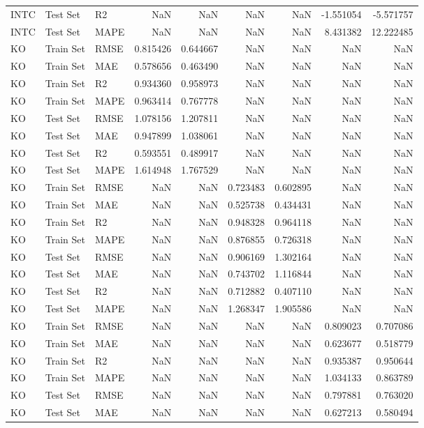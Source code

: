 \begin{tabular}{lllrrrrrr}
INTC & Test Set & R2 & NaN & NaN & NaN & NaN & -1.551054 & -5.571757 \\
INTC & Test Set & MAPE & NaN & NaN & NaN & NaN & 8.431382 & 12.222485 \\
KO & Train Set & RMSE & 0.815426 & 0.644667 & NaN & NaN & NaN & NaN \\
KO & Train Set & MAE & 0.578656 & 0.463490 & NaN & NaN & NaN & NaN \\
KO & Train Set & R2 & 0.934360 & 0.958973 & NaN & NaN & NaN & NaN \\
KO & Train Set & MAPE & 0.963414 & 0.767778 & NaN & NaN & NaN & NaN \\
KO & Test Set & RMSE & 1.078156 & 1.207811 & NaN & NaN & NaN & NaN \\
KO & Test Set & MAE & 0.947899 & 1.038061 & NaN & NaN & NaN & NaN \\
KO & Test Set & R2 & 0.593551 & 0.489917 & NaN & NaN & NaN & NaN \\
KO & Test Set & MAPE & 1.614948 & 1.767529 & NaN & NaN & NaN & NaN \\
KO & Train Set & RMSE & NaN & NaN & 0.723483 & 0.602895 & NaN & NaN \\
KO & Train Set & MAE & NaN & NaN & 0.525738 & 0.434431 & NaN & NaN \\
KO & Train Set & R2 & NaN & NaN & 0.948328 & 0.964118 & NaN & NaN \\
KO & Train Set & MAPE & NaN & NaN & 0.876855 & 0.726318 & NaN & NaN \\
KO & Test Set & RMSE & NaN & NaN & 0.906169 & 1.302164 & NaN & NaN \\
KO & Test Set & MAE & NaN & NaN & 0.743702 & 1.116844 & NaN & NaN \\
KO & Test Set & R2 & NaN & NaN & 0.712882 & 0.407110 & NaN & NaN \\
KO & Test Set & MAPE & NaN & NaN & 1.268347 & 1.905586 & NaN & NaN \\
KO & Train Set & RMSE & NaN & NaN & NaN & NaN & 0.809023 & 0.707086 \\
KO & Train Set & MAE & NaN & NaN & NaN & NaN & 0.623677 & 0.518779 \\
KO & Train Set & R2 & NaN & NaN & NaN & NaN & 0.935387 & 0.950644 \\
KO & Train Set & MAPE & NaN & NaN & NaN & NaN & 1.034133 & 0.863789 \\
KO & Test Set & RMSE & NaN & NaN & NaN & NaN & 0.797881 & 0.763020 \\
KO & Test Set & MAE & NaN & NaN & NaN & NaN & 0.627213 & 0.580494 \\

\end{tabular}
